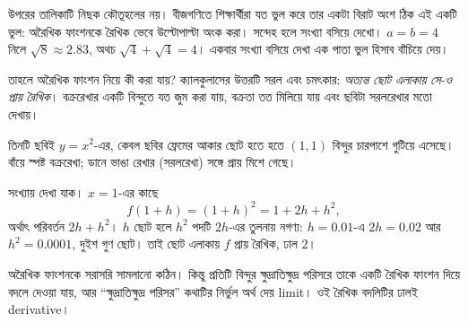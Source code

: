 \documentclass[11pt]{article}
\begin{document}
\begin{remark}
উপরের তালিকাটি নিছক কৌতূহলের নয়। বীজগণিতে শিক্ষার্থীরা যত ভুল করে তার একটা
বিরাট অংশ ঠিক এই একটি ভুল: অরৈখিক ফাংশনকে রৈখিক ভেবে উল্টোপাল্টা অংক করা।
সন্দেহ হলে সংখ্যা বসিয়ে দেখো। $a = b = 4$ নিলে $\sqrt{8} \approx 2.83$,
অথচ $\sqrt{4}+\sqrt{4} = 4$। একবার সংখ্যা বসিয়ে দেখা এক পাতা ভুল হিসাব
বাঁচিয়ে দেয়।
\end{remark}

তাহলে অরৈখিক ফাংশন নিয়ে কী করা যায়? ক্যালকুলাসের উত্তরটি সরল এবং চমৎকার:
\emph{অত্যন্ত ছোট এলাকায় সে-ও প্রায় রৈখিক}। বক্ররেখার একটি বিন্দুতে যত জুম করা যায়,
বক্রতা তত মিলিয়ে যায় এবং ছবিটা সরলরেখার মতো দেখায়।

\begin{center}
\end{center}

তিনটি ছবিই $y = x^{2}$-এর, কেবল ছবির ফ্রেমের আকার ছোট হতে হতে $(1,1)$ বিন্দুর
চারপাশে গুটিয়ে এসেছে। বাঁয়ে স্পষ্ট বক্ররেখা; ডানে ভাঙা রেখার (সরলরেখা) সঙ্গে
প্রায় মিশে গেছে।

সংখ্যায় দেখা যাক। $x = 1$-এর কাছে
\[
  f(1+h) = (1+h)^{2} = 1 + 2h + h^{2} ,
\]
অর্থাৎ পরিবর্তন $2h + h^{2}$। $h$ ছোট হলে $h^{2}$ পদটি $2h$-এর তুলনায় নগণ্য:
$h = 0.01$-এ $2h = 0.02$ আর $h^{2} = 0.0001$, দুইশ গুণ ছোট। তাই ছোট এলাকায়
$f$ প্রায় রৈখিক, ঢাল $2$।

\begin{idea}[ক্যালকুলাসের কৌশল]
অরৈখিক ফাংশনকে সরাসরি সামলানো কঠিন। কিন্তু প্রতিটি বিন্দুর ক্ষুদ্রাতিক্ষুদ্র পরিসরে তাকে
একটি রৈখিক ফাংশন দিয়ে বদলে দেওয়া যায়, আর ``ক্ষুদ্রাতিক্ষুদ্র পরিসর'' কথাটির নির্ভুল
অর্থ দেয় limit। ওই রৈখিক বদলিটির ঢালই derivative।
\end{idea}
\end{document}
